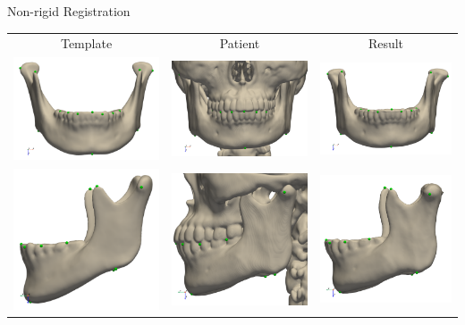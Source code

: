 \documentclass{beamer}
\begin{document}
\begin{frame}{Non-rigid Registration}
  \begin{table}
    \centering
    \begin{tabular}{ccc}
      Template                                                               & Patient                                                                & Result                                                                 \\
      \includegraphics[height = 0.20 \linewidth]{fig/source-skull-front.pdf} & \includegraphics[height = 0.20 \linewidth]{fig/target-skull-front.pdf} & \includegraphics[height = 0.20 \linewidth]{fig/result-skull-front.pdf} \\
      \includegraphics[height = 0.20 \linewidth]{fig/source-skull-side.pdf}  & \includegraphics[height = 0.20 \linewidth]{fig/target-skull-side.pdf}  & \includegraphics[height = 0.20 \linewidth]{fig/result-skull-side.pdf}  \\
    \end{tabular}
  \end{table}
\end{frame}
\end{document}
